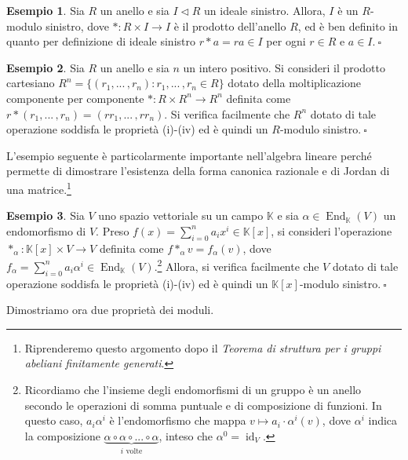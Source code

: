 \documentclass{article}
\theoremstyle{definition}
\newtheorem*{exm}{Esempio}
\begin{document}
\begin{exm}Sia $R$ un anello e sia $I\lhd R$ un ideale sinistro. Allora, $I$ è un $R$-modulo sinistro, dove $\ast\colon R \times I\to I$ è il prodotto dell'anello $R$, ed è ben definito in quanto per definizione di ideale sinistro $r\ast a=ra\in I$ per ogni $r\in R$ e $a\in I. \ \square$\end{exm}

\begin{exm}Sia $R$ un anello e sia $n$ un intero positivo. Si consideri il prodotto cartesiano $R^n=\{(r_1,...\,,r_n): r_1,...\,,r_n\in R\}$ dotato della moltiplicazione componente per componente $\ast\colon R\times R^n\to R^n$ definita come $r\ast (r_1,...\,,r_n)=(rr_1,...\,,rr_n)$. Si verifica facilmente che $R^n$ dotato di tale operazione soddisfa le proprietà (i)-(iv) ed è quindi un $R$-modulo sinistro$. \ \square$\end{exm}

\noindent L'esempio seguente è particolarmente importante nell'algebra lineare perché permette di dimostrare l'esistenza della forma canonica razionale e di Jordan di una matrice.\footnote{Riprenderemo questo argomento dopo il \emph{Teorema di struttura per i gruppi abeliani finitamente generati}.}

\begin{exm}Sia $V$ uno spazio vettoriale su un campo $\mathbb{K}$ e sia $\alpha\in \operatorname{End}_{\mathbb{K}}(V)$ un endomorfismo di $V$. Preso $f(x)=\sum\limits_{i=0}^n a_i x^i \in \mathbb{K}[x]$, si consideri l'operazione $\ast_{\alpha}\colon \mathbb{K}[x]\times V\to V$ definita come $f\ast_{\alpha} v =f_{\alpha}(v)$, dove $f_{\alpha}=\sum\limits_{i=0}^n a_i \alpha^i \in \operatorname{End}_{\mathbb{K}}(V)$.\footnote{Ricordiamo che l'insieme degli endomorfismi di un gruppo è un anello secondo le operazioni di somma puntuale e di composizione di funzioni. In questo caso, $a_i \alpha^i$ è l'endomorfismo che mappa $v\mapsto a_i\cdot \alpha^i(v)$, dove $\alpha^i$ indica la composizione $\underbrace{\alpha\circ \alpha\circ ... \circ \alpha}_{i \text{ volte}}$, inteso che $\alpha^0=\operatorname{id}_{V}$.} Allora, si verifica facilmente che $V$ dotato di tale operazione soddisfa le proprietà (i)-(iv) ed è quindi un $\mathbb{K}[x]$-modulo sinistro$. \ \square$\end{exm}

\noindent Dimostriamo ora due proprietà dei moduli.
\end{document}
